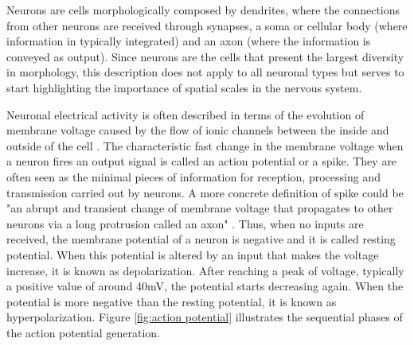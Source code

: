 Neurons are cells morphologically composed by dendrites, where the connections from other neurons are received through synapses, a soma or cellular body (where information in typically integrated) and an axon (where the information is conveyed as output). Since neurons are the cells that present the largest diversity in morphology, this description does not apply to all neuronal types but serves to start highlighting the importance of spatial scales in the nervous system. 

Neuronal electrical activity is often described in terms of the evolution of membrane voltage caused by the flow of ionic channels between the inside and outside of the cell \parencite{kandel_principles_2012}. The characteristic fast change in the membrane voltage when a neuron fires an output signal is called an action potential or a spike. They are often seen as the minimal pieces of information for reception, processing and transmission carried out by neurons. A more concrete definition of spike could be "an abrupt and transient change of membrane voltage that propagates to other neurons via a long protrusion called an axon" \parencite{izhikevich_dynamical_2007}. Thus, when no inputs are received, the membrane potential of a neuron is negative and it is called resting potential. When this potential is altered by an input that makes the voltage increase, it is known as depolarization. After reaching a peak of voltage, typically a positive value of around 40mV, the potential starts decreasing again. When the potential is more negative than the resting potential, it is known as hyperpolarization. Figure \ref{fig:action potential} illustrates the sequential phases of the action potential generation. 

